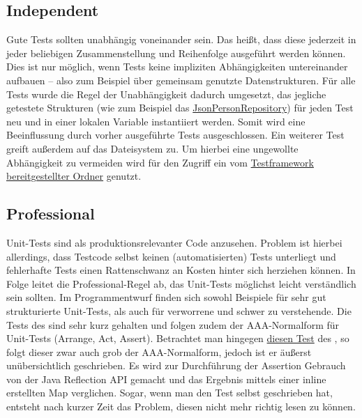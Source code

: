 \subsection{Independent}
Gute Tests sollten unabhängig voneinander sein.
Das heißt, dass diese jederzeit in jeder beliebigen Zusammenstellung und Reihenfolge ausgeführt werden können.
Dies ist nur möglich, wenn Tests keine impliziten Abhängigkeiten untereinander aufbauen -- also zum Beispiel über gemeinsam genutzte Datenstrukturen.
Für alle Tests wurde die Regel der Unabhängigkeit dadurch umgesetzt, das jegliche getestete Strukturen (wie zum Beispiel das \href{https://github.com/yschiebelhut/carpool-java/blob/6d938e78763ca42270aafb8f51de4104c88e558a/0-carpool-java-plugin-json/src/test/java/speicher/JsonPersonRepositoryTest.java}{JsonPersonRepository}) für jeden Test neu und in einer lokalen Variable instantiiert werden.
Somit wird eine Beeinflussung durch vorher ausgeführte Tests ausgeschlossen.
Ein weiterer Test greift außerdem auf das Dateisystem zu.
Um hierbei eine ungewollte Abhängigkeit zu vermeiden wird für den Zugriff ein vom \href{https://github.com/yschiebelhut/carpool-java/blob/6d938e78763ca42270aafb8f51de4104c88e558a/0-carpool-java-plugin-json/src/test/java/speicher/JsonPersonRepositoryTest.java#L142}{Testframework bereitgestellter Ordner} genutzt.

\subsection{Professional}
Unit-Tests sind als produktionsrelevanter Code anzusehen.
Problem ist hierbei allerdings, dass Testcode selbst keinen (automatisierten) Tests unterliegt und fehlerhafte Tests einen Rattenschwanz an Kosten hinter sich herziehen können.
In Folge leitet die Professional-Regel ab, das Unit-Tests möglichst leicht verständlich sein sollten.
Im Programmentwurf finden sich sowohl Beispiele für sehr gut strukturierte Unit-Tests, als auch für verworrene und schwer zu verstehende.
Die Tests des \href{https://github.com/yschiebelhut/carpool-java/blob/6d938e78763ca42270aafb8f51de4104c88e558a/0-carpool-java-integration/src/test/java/paypal/PayPalLinkBuilderTest.java}{} sind sehr kurz gehalten und folgen zudem der AAA-Normalform für Unit-Tests (Arrange, Act, Assert).
Betrachtet man hingegen \href{https://github.com/yschiebelhut/carpool-java/blob/6d938e78763ca42270aafb8f51de4104c88e558a/0-carpool-java-plugin-json/src/test/java/speicher/JsonFahrgemeinschaftRepositoryTest.java#L26}{diesen Test} des , so folgt dieser zwar auch grob der AAA-Normalform, jedoch ist er äußerst unübersichtlich geschrieben.
Es wird zur Durchführung der Assertion Gebrauch von der Java Reflection API gemacht und das Ergebnis mittels einer inline erstellten Map verglichen.
Sogar, wenn man den Test selbst geschrieben hat, entsteht nach kurzer Zeit das Problem, diesen nicht mehr richtig lesen zu können.

